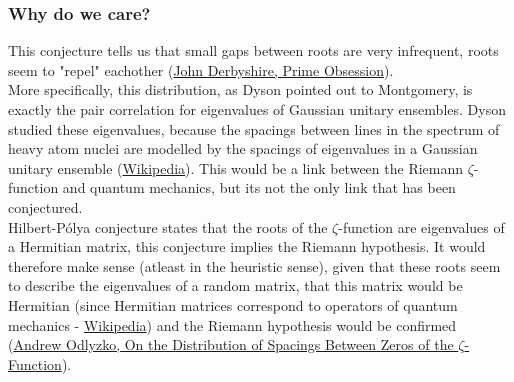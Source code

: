 \subsubsection{Why do we care?}
This conjecture tells us that small gaps between roots are very infrequent, roots seem to 
"repel" eachother 
(\href{https://www.saxo.com/dk/prime-obsession_john-derbyshire_paperback_9780452285255}{John Derbyshire, Prime Obsession}).
\\
More specifically, this distribution, as Dyson pointed out to Montgomery, is exactly the 
pair correlation for 
eigenvalues of Gaussian unitary ensembles. Dyson studied these eigenvalues, because the spacings 
between lines in the spectrum 
of heavy atom nuclei are modelled by the spacings of eigenvalues in a Gaussian unitary ensemble 
(\href{https://en.wikipedia.org/wiki/Random_matrix}{Wikipedia}). This would 
be a link between the Riemann $\zeta$-function and 
quantum mechanics, but its not the only link that has been conjectured. 
\\
Hilbert-Pólya conjecture states that the roots of the $\zeta$-function 
are eigenvalues of a Hermitian matrix, this conjecture implies the Riemann hypothesis. It would 
therefore make sense (atleast in the heuristic sense), given that these roots seem 
to describe the eigenvalues of a random matrix, that this matrix would be Hermitian 
(since Hermitian matrices correspond to operators of quantum mechanics - 
\href{https://en.wikipedia.org/wiki/Hermitian_matrix#Applications}{Wikipedia}) and the Riemann hypothesis would be confirmed 
(\href{https://www.jstor.org/stable/2007890?read-now=1&seq=3}{Andrew Odlyzko, 
On the Distribution of Spacings Between Zeros of the $\zeta$-Function}).


